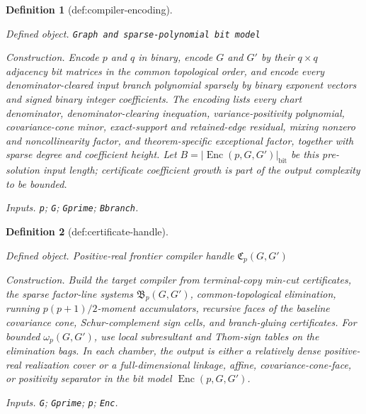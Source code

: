 \documentclass{article}
\newtheorem{definition}{Definition}
\begin{document}
\begin{definition}[def:compiler-encoding]\label{def:compiler-encoding}
\par\smallskip\noindent\emph{Defined object.} \texttt{Graph and sparse-\allowbreak{}polynomial bit model}
\par\smallskip\noindent\emph{Construction.} Encode \(p\) and \(q\) in binary, encode \(G\) and \(G'\) by their \(q\times q\) adjacency bit matrices in the common topological order, and encode every denominator-cleared input branch polynomial sparsely by binary exponent vectors and signed binary integer coefficients. The encoding lists every chart denominator, denominator-clearing inequation, variance-positivity polynomial, covariance-cone minor, exact-support and retained-edge residual, mixing nonzero and noncollinearity factor, and theorem-specific exceptional factor, together with sparse degree and coefficient height. Let \(B=|\operatorname{Enc}(p,G,G')|_{\mathrm{bit}}\) be this pre-solution input length; certificate coefficient growth is part of the output complexity to be bounded.
\par\smallskip\noindent\emph{Inputs.} \texttt{p}; \texttt{G}; \texttt{Gprime}; \texttt{Bbranch}.
\end{definition}

\begin{definition}[def:certificate-handle]\label{def:certificate-handle}
\par\smallskip\noindent\emph{Defined object.} Positive-real frontier compiler handle \(\mathfrak C_p(G,G')\)
\par\smallskip\noindent\emph{Construction.} Build the target compiler from terminal-copy min-cut certificates, the sparse factor-line systems \(\mathfrak B_p(G,G')\), common-topological elimination, running \(p(p+1)/2\)-moment accumulators, recursive faces of the baseline covariance cone, Schur-complement sign cells, and branch-gluing certificates. For bounded \(\omega_p(G,G')\), use local subresultant and Thom-sign tables on the elimination bags. In each chamber, the output is either a relatively dense positive-real realization cover or a full-dimensional linkage, affine, covariance-cone-face, or positivity separator in the bit model \(\operatorname{Enc}(p,G,G')\).
\par\smallskip\noindent\emph{Inputs.} \texttt{G}; \texttt{Gprime}; \texttt{p}; \texttt{Enc}.
\end{definition}
\end{document}
